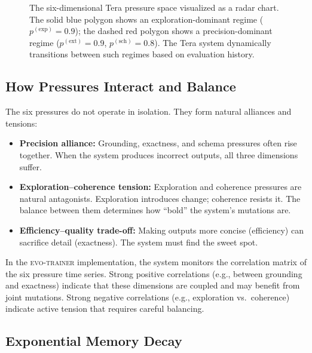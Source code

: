 \begin{figure}[t]
\caption{The six-dimensional Tera pressure space visualized as a radar chart. The solid blue polygon shows an exploration-dominant regime ($p^{(\text{exp})} = 0.9$); the dashed red polygon shows a precision-dominant regime ($p^{(\text{ext})} = 0.9$, $p^{(\text{sch})} = 0.8$). The Tera system dynamically transitions between such regimes based on evaluation history.}
\label{fig:tera-pressure-space}
\end{figure}

\subsection{How Pressures Interact and Balance}

The six pressures do not operate in isolation. They form natural alliances and tensions:

\begin{itemize}[leftmargin=1.5em]
  \item \textbf{Precision alliance:} Grounding, exactness, and schema pressures often rise together. When the system produces incorrect outputs, all three dimensions suffer.
  \item \textbf{Exploration--coherence tension:} Exploration and coherence pressures are natural antagonists. Exploration introduces change; coherence resists it. The balance between them determines how ``bold'' the system's mutations are.
  \item \textbf{Efficiency--quality trade-off:} Making outputs more concise (efficiency) can sacrifice detail (exactness). The system must find the sweet spot.
\end{itemize}

\begin{implnote}
In the \textsc{evo-trainer} implementation, the system monitors the correlation matrix of the six pressure time series. Strong positive correlations (e.g., between grounding and exactness) indicate that these dimensions are coupled and may benefit from joint mutations. Strong negative correlations (e.g., exploration vs.\ coherence) indicate active tension that requires careful balancing.
\end{implnote}

\subsection{Exponential Memory Decay}
\label{subsec:memory-decay}

